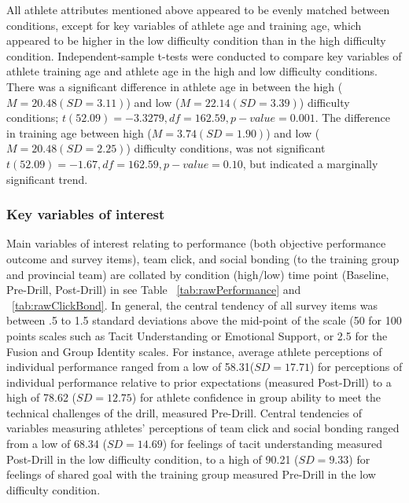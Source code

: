 All athlete attributes mentioned above appeared to be evenly matched between conditions, except for key variables of athlete age and training age, which appeared to be higher in the low difficulty condition than in the high difficulty condition. Independent-sample t-tests were conducted to compare key variables of athlete training age and athlete age in the high and low difficulty conditions. There was a significant difference in athlete age in between the high ($M= 20.48(SD =3.11)$) and low ($M= 22.14(SD =3.39)$) difficulty conditions; $t(52.09) = -3.3279, df = 162.59, p-value = 0.001$.  The difference in training age between high ($M= 3.74 (SD =1.90)$) and low ($M= 20.48(SD =2.25)$) difficulty conditions, was not significant $t(52.09)= -1.67, df = 162.59, p-value = 0.10$, but indicated a marginally significant trend.




\subsubsection{Key variables of interest \label{sec:surveyResponses}}

Main variables of interest relating to performance (both objective performance outcome and survey items), team click, and social bonding (to the training group and provincial team) are collated by condition (high/low) time point (Baseline, Pre-Drill, Post-Drill) in see Table ~\ref{tab:rawPerformance} and ~\ref{tab:rawClickBond}. In general, the central tendency of all survey items was between .5 to 1.5 standard deviations above the mid-point of the scale (50 for 100 points scales such as Tacit Understanding or Emotional Support, or 2.5 for the Fusion and Group Identity scales.   For instance, average athlete perceptions of individual performance ranged from a low of 58.31($SD = 17.71$) for perceptions of individual performance relative to prior expectations (measured Post-Drill) to a high of 78.62 ($SD = 12.75$) for athlete confidence in group ability to meet the technical challenges of the drill, measured Pre-Drill.  Central tendencies of variables measuring athletes' perceptions of team click and social bonding ranged from a low of 68.34 ($SD = 14.69$) for feelings of tacit understanding measured Post-Drill in the low difficulty condition, to a high of 90.21 ($SD = 9.33$) for feelings of shared goal with the training group measured Pre-Drill in the low difficulty condition.


